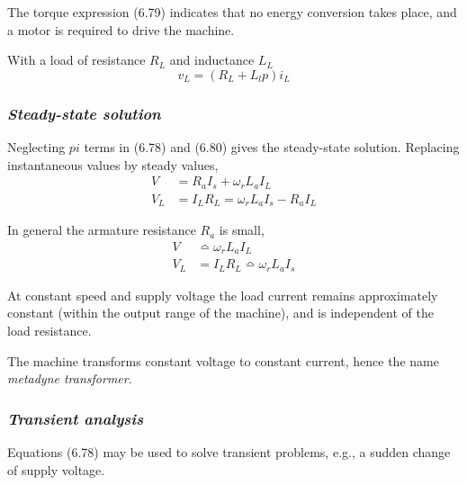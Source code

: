 \documentclass[a4paper,numbers=noenddot,12pt]{scrbook}
\begin{document}
    The torque expression (6.79) indicates that no energy conversion takes place, and a motor is required to drive the machine.

    With a load of resistance $R_L$ and inductance $L_L$
    \begin{equation}
        v_L = (R_L + L_l p)i_L
        \label{eq_Eq6.80}
    \end{equation}

    \subsubsection{\textit{Steady-state solution}}
    Neglecting $p i$ terms in (6.78) and (6.80) gives the steady-state solution. Replacing instantaneous values by steady values,
    \begin{equation}
        \begin{aligned}
            V  & = R_a I_s + \omega_r L_ a I_L \\
            V_L & = I_L R_L = \omega_r L_a I_s - R_a I_L
        \end{aligned}
        \label{eq:Eq6.81}
    \end{equation}

    In general the armature resistance $R_a$ is small,
    \begin{equation}
        \begin{aligned}
            V & \bumpeq \omega_r L_a I_L \\
            V_ L & =I_L R_L \bumpeq \omega_r L_a I_s 
        \end{aligned}
        \label{eq_Eq6.82}
    \end{equation}

    At constant speed and supply voltage the load current remains approximately constant (within the output range of the machine), and is independent of the load resistance.

    The machine transforms constant voltage to constant current, hence the name \textit{metadyne transformer}.

    \subsubsection{\textit{Transient analysis}}
    Equations (6.78) may be used to solve transient problems, e.g., a sudden change of supply voltage.
\end{document}
